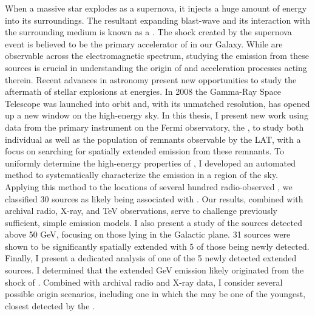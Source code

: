\label{abstract}
When a massive star explodes as a supernova,  it injects a huge amount of energy into its surroundings. The resultant expanding blast-wave and its interaction with the surrounding medium is known as a \snr{}. The shock created by the supernova event is believed to be the primary accelerator of \crs{} in our Galaxy. While \snrs{} are observable across the electromagnetic spectrum, studying the \gam{} emission from these sources is crucial in understanding the origin of \crs{} and acceleration processes acting therein. Recent advances in \gam{} astronomy present new opportunities to study the aftermath of stellar explosions at \gam{} energies. In 2008 the \Fermi{} Gamma-Ray Space Telescope was launched into orbit and, with its unmatched \gam{} resolution, has opened up a new window on the high-energy sky. In this thesis, I present new work using data from the primary instrument on the Fermi observatory, the \lat{}, to study both individual \snrs{} as well as the population of remnants observable by the LAT, with a focus on searching for spatially extended emission from these remnants.  To uniformly determine the high-energy properties of \snrs{}, I developed an automated method to systematically characterize the \gam{} emission in a region of the sky. Applying this method to the locations of several hundred radio-observed \snrs{}, we classified 30 \gam{} sources as likely being associated with \snrs{}. Our results, combined with archival radio, X-ray, and TeV observations, serve to challenge previously sufficient, simple \gam{} \snr{} emission models. I also present a study of the sources detected above 50 GeV, focusing on those lying in the Galactic plane.  31 sources were shown to be significantly spatially extended with 5 of those being newly detected. Finally, I present a dedicated analysis of one of the 5 newly detected extended sources. I determined that the extended GeV emission likely originated from the shock of  \snr{} \Gone{}. Combined with archival radio and X-ray data, I consider several possible origin scenarios, including one in which the \snr{} may be one of the youngest, closest \gam{} \snrs{} detected by the \lat{}.



